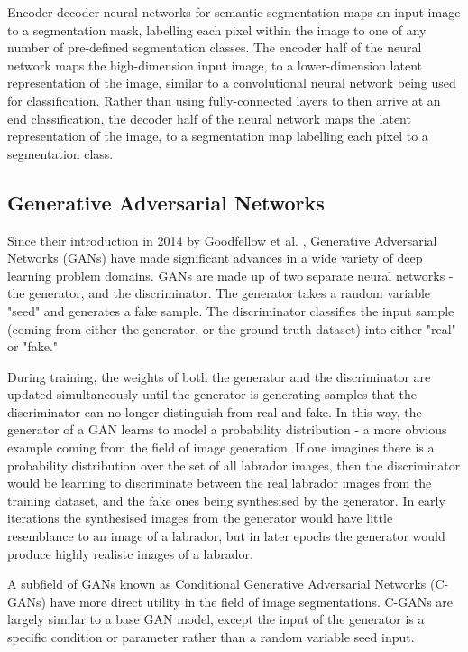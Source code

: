 Encoder-decoder neural networks for semantic segmentation maps an input image to
a segmentation mask, labelling each pixel within the image to one of any number
of pre-defined segmentation classes. The encoder half of the neural network maps
the high-dimension input image, to a lower-dimension latent representation of
the image, similar to a convolutional neural network being used for
classification. Rather than using fully-connected layers to then arrive at an
end classification, the decoder half of the neural network maps the latent
representation of the image, to a segmentation map labelling each pixel to a
segmentation class. \newline

\subsection{Generative Adversarial Networks}

Since their introduction in 2014 by Goodfellow et al.
\cite{goodfellowGenerativeAdversarialNets2014}, Generative Adversarial Networks
(GANs) have made significant advances in a wide variety of deep learning problem
domains. GANs are made up of two separate neural networks - the generator, and
the discriminator. The generator takes a random variable "seed" and generates a
fake sample. The discriminator classifies the input sample (coming from either
the generator, or the ground truth dataset) into either "real" or "fake."
\newline

During training, the weights of both the generator and the discriminator are
updated simultaneously until the generator is generating samples that the
discriminator can no longer distinguish from real and fake. In this way, the
generator of a GAN learns to model a probability distribution - a more obvious
example coming from the field of image generation. If one imagines there is a
probability distribution over the set of all labrador images, then the
discriminator would be learning to discriminate between the real labrador images
from the training dataset, and the fake ones being synthesised by the generator.
In early iterations the synthesised images from the generator would have little
resemblance to an image of a labrador, but in later epochs the generator would
produce highly realistc images of a labrador. \newline

A subfield of GANs known as Conditional Generative Adversarial Networks (C-GANs)
have more direct utility in the field of image segmentations. C-GANs are largely
similar to a base GAN model, except the input of the generator is a specific
condition or parameter rather than a random variable seed input. \newline

